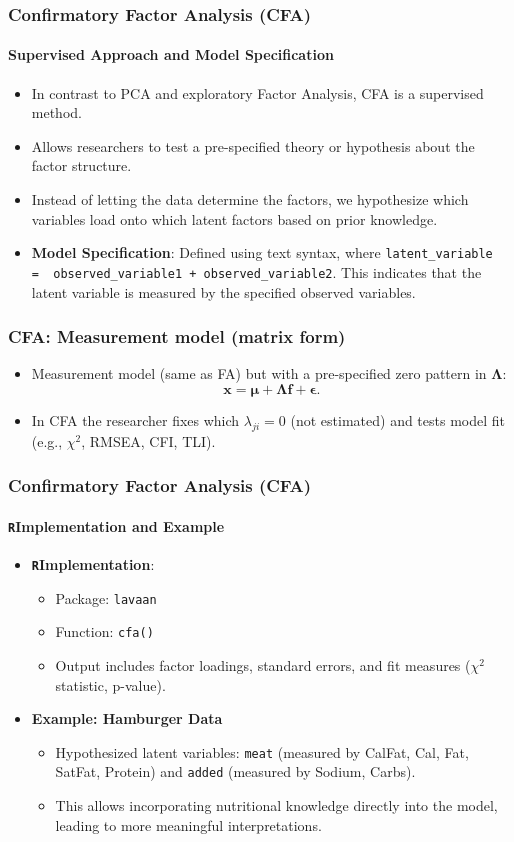 \documentclass{beamer}
\newcommand{\R}{\texttt{R}}
\newcommand{\code}[1]{\texttt{#1}}
\begin{document}
\begin{frame}
    \frametitle{Confirmatory Factor Analysis (CFA)}
    \framesubtitle{Supervised Approach and Model Specification}
    \begin{itemize}
        \item In contrast to PCA and exploratory Factor Analysis, CFA is a \alert{supervised} method.
        \item Allows researchers to \alert{test a pre-specified theory} or hypothesis about the factor structure.
        \item Instead of letting the data determine the factors, we hypothesize which variables load onto which latent factors based on prior knowledge.
    \item \textbf{Model Specification}: Defined using text syntax, where \texttt{latent\_variable =~ observed\_variable1 + observed\_variable2}. This indicates that the latent variable is measured by the specified observed variables.
    \end{itemize}
\end{frame}

\begin{frame}
    \frametitle{CFA: Measurement model (matrix form)}
    \begin{itemize}
        \item Measurement model (same as FA) but with a pre-specified zero pattern in $\mathbf{\Lambda}$:
        \[\mathbf{x}=\boldsymbol{\mu}+\mathbf{\Lambda}\mathbf{f}+\boldsymbol{\epsilon}.
        \]
        \item In CFA the researcher fixes which $\lambda_{ji}=0$ (not estimated) and tests model fit (e.g., $\chi^2$, RMSEA, CFI, TLI).
    \end{itemize}
\end{frame}

\begin{frame}
    \frametitle{Confirmatory Factor Analysis (CFA)}
    \framesubtitle{\R Implementation and Example}
    \begin{itemize}
        \item \textbf{\R Implementation}:
            \begin{itemize}
                \item Package: \code{lavaan}
                \item Function: \code{cfa()}
                \item Output includes factor loadings, standard errors, and fit measures ($\chi^2$ statistic, p-value).
            \end{itemize}
        \item \textbf{Example: Hamburger Data}
            \begin{itemize}
                \item Hypothesized latent variables: \code{meat} (measured by CalFat, Cal, Fat, SatFat, Protein) and \code{added} (measured by Sodium, Carbs).
                \item This allows incorporating nutritional knowledge directly into the model, leading to more meaningful interpretations.
            \end{itemize}
    \end{itemize}
\end{frame}
\end{document}
